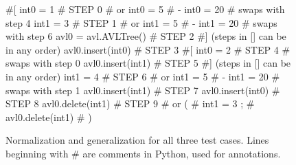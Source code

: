 \begin{figure}
{\scriptsize
\begin{code}
\textcolor{black!60}{\#[}
int0 = 1                              \textcolor{black!60}{\# STEP 0}
\textcolor{black!60}{\#  or int0 = 5 }
\textcolor{black!60}{\#   - int0 = 20} 
\textcolor{black!60}{\#  swaps with step 4}
int1 = 3                              \textcolor{black!60}{\# STEP 1}
\textcolor{black!60}{\#  or int1 = 5 }
\textcolor{black!60}{\#   - int1 = 20} 
\textcolor{black!60}{\#  swaps with step 6}
avl0 = avl.AVLTree()                  \textcolor{black!60}{\# STEP 2}
\textcolor{black!60}{\#] (steps in [] can be in any order)}
avl0.insert(int0)                     \textcolor{black!60}{\# STEP 3}
\textcolor{black!60}{\#[}
int0 = 2                              \textcolor{black!60}{\# STEP 4}
\textcolor{black!60}{\#  swaps with step 0}
avl0.insert(int1)                     \textcolor{black!60}{\# STEP 5}
\textcolor{black!60}{\#] (steps in [] can be in any order)}
int1 = 4                              \textcolor{black!60}{\# STEP 6}
\textcolor{black!60}{\#  or int1 = 5 }
\textcolor{black!60}{\#   - int1 = 20} 
\textcolor{black!60}{\#  swaps with step 1}
avl0.insert(int1)                     \textcolor{black!60}{\# STEP 7}
avl0.insert(int0)                     \textcolor{black!60}{\# STEP 8}
avl0.delete(int1)                     \textcolor{black!60}{\# STEP 9}
\textcolor{black!60}{\#  or (}
\textcolor{black!60}{\#      int1 = 3  ;}
\textcolor{black!60}{\#      avl0.delete(int1) }
\textcolor{black!60}{\#     )}
\end{code}
}
\caption{Normalization and generalization for all three test cases.
  Lines beginning with \# are comments in Python, used for annotations.}
\label{normalgen}
\end{figure}

